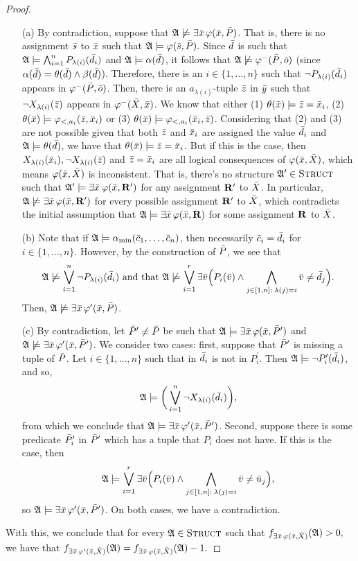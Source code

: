 \begin{enumerate}
\begin{proof}
		\begin{enumerate}
			\item[(a)] By contradiction, suppose that $\A\not\models\exists\x\,\varphi(\x,\P)$. That is, there is no assignment $\s$ to $\x$ such that $\A\models\varphi(\s,\P).$ Since $\d$ is such that $\A\models \bigwedge_{i=1}^n P_{\lambda(i)}(\d_i)$ and $\A\models \alpha(\d)$, it follows that $\A\not\models\varphi^{-}(\P,\ep)$ (since $\alpha(\d)=\theta(\d)\wedge\beta(\d)$). Therefore, there is an $i\in\{1,\ldots,n\}$ such that $\neg P_{\lambda(i)}(\d_i)$ appears in $\varphi^{-}(\P,\ep)$. Then, there is an $a_{\lambda(i)}$-tuple $\z$ in $\y$ such that $\neg X_{\lambda(i)}(\z)$ appears in $\varphi^{-}(\X,\x)$. We know that either (1) $\theta(\x)\models \z = \x_i$, (2) $\theta(\x)\models \varphi_{<,a_i}(\z,\x_i)$ or (3) $\theta(\x)\models \varphi_{<,a_i}(\x_i,\z)$. Considering that (2) and (3) are not possible given that both $\z$ and $\x_i$ are assigned the value $\d_i$ and $\A\models\theta(\d)$, we have that $\theta(\x)\models \z = \x_i$. But if this is the case, then $X_{\lambda(i)}(\x_i), \neg X_{\lambda(i)}(\z)$ and $\z = \x_i$ are all logical consequences of $\varphi(\x,\X)$, which means $\varphi(\x,\X)$ is inconsistent. That is, there's no structure $\A^\prime\in\str$ such that $\A^\prime\models\exists\x\:\varphi(\x,\R^\prime)$ for any assignment $\R^\prime$ to $\X$. In particular, $\A\not\models\exists\x\,\varphi(\x,\R^\prime)$ for every possible assignment $\R^\prime$ to $\X$, which contradicts the initial assumption that $\A\models\exists\x\,\varphi(\x,\R)$ for some assignment $\R$ to $\X$.
			\item[(b)] Note that if $\A \models \alpha_{\min}(\c_1,\ldots,\c_n)$, then necessarily $\c_i = \d_i$ for $i\in\{1,\ldots,n\}.$ However, by the construction of $\P$, we see that 
			$$\A\not\models\bigvee_{i = 1}^{n}\neg P_{\lambda(i)}(\d_i) \text{ and that } \A\not\models\bigvee_{i=1}^r \exists \v\Big( P_i(\v) \wedge \bigwedge_{j\in[1,n]:\: \lambda(j) = i} \v \neq \d_j\Big).$$ Then, $\A\not\models\exists\x\,\varphi^\prime(\x,\P)$.
			\item[(c)] By contradiction, let $\P^\prime \neq \P$ be such that $\A\models\exists\x\,\varphi(\x,\P^\prime)$ and $\A\not\models\exists\x\,\varphi^\prime(\x,\P^\prime)$. We consider two cases: first, suppose that $\P^\prime$ is missing a tuple of $\P$. Let $i\in\{1,\ldots,n\}$ such that in $\d_i$ is not in $P^\prime_i$. Then $\A\models \neg P^\prime_i(\d_i)$, and so,$$\A\models \bigg(\bigvee_{i = 1}^{n}\neg X_{\lambda(i)}(\d_i) \bigg), $$ from which we conclude that $\A\models\exists\x\,\varphi^\prime(\x,\P^\prime)$. Second, suppose there is some predicate $\P^\prime_i$ in $\P^\prime$ which has a tuple that $P_i$ does not have. If this is the case, then $$\A\models\bigvee_{i=1}^r \exists \v\Big( P_i(\v) \wedge \bigwedge_{j\in[1,n]:\: \lambda(j) = i} \v \neq \u_j\Big),$$ so $\A\models\exists\x\,\varphi^\prime(\x,\P^\prime)$. On both cases, we have a contradiction.
		\end{enumerate}
		With this, we conclude that for every $\A\in\str$ such that $f_{\exists\x\,\varphi(\x,\X)}(\A)>0,$ we have that $f_{\exists\x\,\varphi^\prime(\x,\X)}(\A) = f_{\exists\x\,\varphi(\x,\X)}(\A)-1.$
		

\end{proof}
\end{enumerate}
